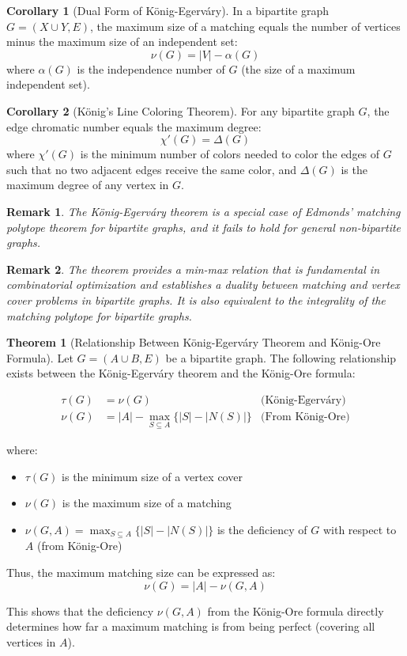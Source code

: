 \documentclass{article}
\newtheorem{remark}{Remark}
\theoremstyle{definition}
\newtheorem{theorem}{Theorem}
\newtheorem{corollary}{Corollary}
\begin{document}
\begin{corollary}[Dual Form of König-Egerváry]
In a bipartite graph $G = (X \cup Y, E)$, the maximum size of a matching equals the number of vertices minus the maximum size of an independent set:
\[
\nu(G) = |V| - \alpha(G)
\]
where $\alpha(G)$ is the independence number of $G$ (the size of a maximum independent set).
\end{corollary}

\begin{corollary}[König's Line Coloring Theorem]
For any bipartite graph $G$, the edge chromatic number equals the maximum degree:
\[
\chi'(G) = \Delta(G)
\]
where $\chi'(G)$ is the minimum number of colors needed to color the edges of $G$ such that no two adjacent edges receive the same color, and $\Delta(G)$ is the maximum degree of any vertex in $G$.
\end{corollary}

\begin{remark}
The König-Egerváry theorem is a special case of Edmonds' matching polytope theorem for bipartite graphs, and it fails to hold for general non-bipartite graphs.
\end{remark}

\begin{remark}
The theorem provides a min-max relation that is fundamental in combinatorial optimization and establishes a duality between matching and vertex cover problems in bipartite graphs. It is also equivalent to the integrality of the matching polytope for bipartite graphs.
\end{remark}

\begin{theorem}[Relationship Between König-Egerváry Theorem and König-Ore Formula]
Let $G = (A \cup B, E)$ be a bipartite graph. The following relationship exists between the König-Egerváry theorem and the König-Ore formula:

\begin{align}
\tau(G) &= \nu(G) & \text{(König-Egerváry)} \\
\nu(G) &= |A| - \max_{S \subseteq A} \{|S| - |N(S)|\} & \text{(From König-Ore)}
\end{align}

where:
\begin{itemize}
    \item $\tau(G)$ is the minimum size of a vertex cover
    \item $\nu(G)$ is the maximum size of a matching
    \item $\nu(G, A) = \max_{S \subseteq A} \{|S| - |N(S)|\}$ is the deficiency of $G$ with respect to $A$ (from König-Ore)
\end{itemize}

Thus, the maximum matching size can be expressed as:
\[
\nu(G) = |A| - \nu(G, A)
\]

This shows that the deficiency $\nu(G, A)$ from the König-Ore formula directly determines how far a maximum matching is from being perfect (covering all vertices in $A$).
\end{theorem}
\end{document}
